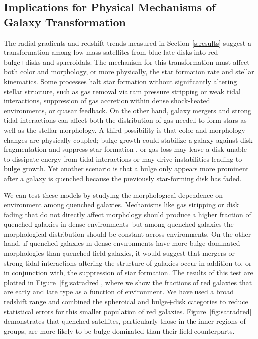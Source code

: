 \documentclass[12pt]{emulateapj}
\begin{document}

\subsection{Implications for Physical Mechanisms of Galaxy Transformation}

The radial gradients and redshift trends measured in
Section~\ref{s:results} suggest a transformation among low mass
satellites from blue late disks into red bulge+disks and spheroidals.
The mechanism for this transformation must affect both color and
morphology, or more physically, the star formation rate and stellar
kinematics. Some processes \citep[see e.g.][for a review]{Boselli2006}
halt star formation without significantly altering stellar structure,
such as gas removal via ram pressure stripping or weak tidal
interactions, suppression of gas accretion within dense
shock-heated environments, or quasar feedback. On the other hand, galaxy mergers and
strong tidal interactions can affect both the distribution of gas
needed to form stars as well as the stellar morphology. A third
possibility is that color and morphology changes are physically
coupled; bulge growth could stabilize a galaxy against
  disk fragmentation and suppress star formation \citep{Martig2009},
  or gas loss may leave a disk unable to dissipate energy from tidal
  interactions or may drive instabilities leading to bulge growth.
Yet another scenario is that a bulge only appears more prominent after
a galaxy is quenched because the previously star-forming disk has
faded.

We can test these models by studying the morphological dependence on
environment among quenched galaxies. Mechanisms like gas stripping or
disk fading that do not directly affect morphology should produce a
higher fraction of quenched galaxies in dense environments, but among
quenched galaxies the morphological distribution should be
constant across environments. On the other hand, if quenched galaxies in dense
environments have more bulge-dominated morphologies than quenched
field galaxies, it would suggest that mergers or strong tidal
interactions altering the structure of galaxies occur in addition to,
or in conjunction with, the suppression of star formation. The results
of this test are plotted in Figure~\ref{fig:satradred}, where we show
the fractions of red galaxies that are early and late type as a
function of environment. We have used a broad redshift range and
combined the spheroidal and bulge+disk categories to reduce
statistical errors for this smaller population of red
galaxies. Figure~\ref{fig:satradred} demonstrates that quenched
satellites, particularly those in the inner regions of groups, are
more likely to be bulge-dominated than their field
counterparts. 
\end{document}
